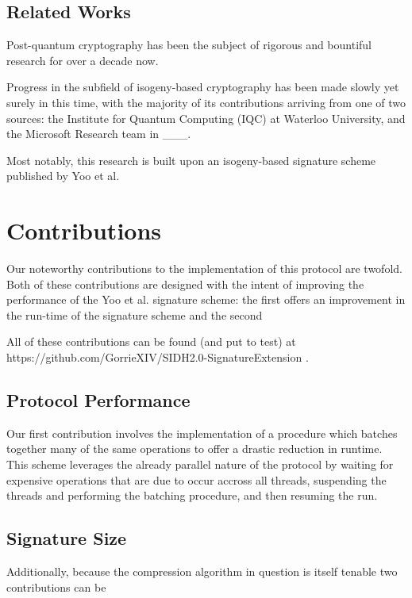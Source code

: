 \subsection{Related Works}

Post-quantum cryptography has been the subject of rigorous and bountiful research for over a decade now. 

Progress in the subfield of isogeny-based cryptography has been made slowly yet surely in this time, with the majority of its contributions arriving from one of two sources: the Institute for Quantum Computing (IQC) at Waterloo University, and the Microsoft Research team in \_\_\_. 

Most notably, this research is built upon an isogeny-based signature scheme published by Yoo et al. 

\section{Contributions}

Our noteworthy contributions to the implementation of this protocol are twofold. Both of these contributions are designed with the intent of improving the performance of the Yoo et al. signature scheme: the first offers an improvement in the run-time of the signature scheme and the second 


All of these contributions can be found (and put to test) at https://github.com/GorrieXIV/SIDH2.0-SignatureExtension .

\subsection{Protocol Performance}

Our first contribution involves the implementation of a procedure which batches together many of the same operations to offer a drastic reduction in runtime. This scheme leverages the already parallel nature of the protocol by waiting for expensive operations that are due to occur accross all threads, suspending the threads and performing the batching procedure, and then resuming the run.


\subsection{Signature Size}

Additionally, because the compression algorithm in question is itself tenable two contributions can be \\


